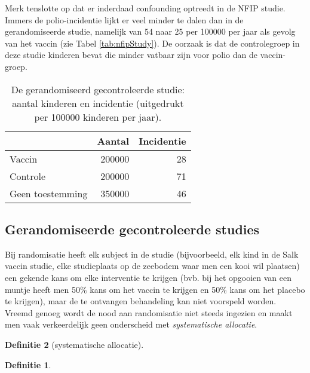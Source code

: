\documentclass[
  12pt,dutch,coursenotes]{book}
\theoremstyle{definition}
\newtheorem{definition}{Definitie}[chapter]
\theoremstyle{definition}
\theoremstyle{definition}
\theoremstyle{remark}
\begin{document}
Merk tenslotte op dat er inderdaad confounding optreedt in de NFIP studie. Immers
de polio-incidentie lijkt er veel minder te dalen dan in de gerandomiseerde studie, namelijk van 54 naar 25
per 100000 per jaar als gevolg van het vaccin (zie Tabel \ref{tab:nfipStudy}). De oorzaak is dat
de controlegroep in deze studie kinderen bevat die minder vatbaar zijn voor
polio dan de vaccin-groep.

\begin{table}[t]

\caption{\label{tab:dbrcStudy}De gerandomiseerd gecontroleerde studie: aantal kinderen en incidentie (uitgedrukt per
100000 kinderen per jaar).}
\centering
\begin{tabular}{lrr}
\toprule
  & Aantal & Incidentie\\
\midrule
Vaccin & 200000 & 28\\
Controle & 200000 & 71\\
Geen toestemming & 350000 & 46\\
\bottomrule
\end{tabular}
\end{table}

\hypertarget{gerandomiseerde-gecontroleerde-studies}{%
\subsection{Gerandomiseerde gecontroleerde studies}\label{gerandomiseerde-gecontroleerde-studies}}

Bij randomisatie heeft elk subject in de studie (bijvoorbeeld, elk kind in de Salk vaccin studie, elke studieplaats op de zeebodem waar men een kooi wil plaatsen) een gekende kans om elke interventie te krijgen (bvb. bij het opgooien van een muntje heeft men 50\% kans om het
vaccin te krijgen en 50\% kans om het placebo te krijgen), maar de te
ontvangen behandeling kan niet voorspeld worden. Vreemd genoeg wordt de nood
aan randomisatie niet steeds ingezien en maakt men vaak verkeerdelijk geen
onderscheid met \emph{systematische allocatie}.

\begin{definition}[systematische allocatie]
\begin{definition}

\protect\hypertarget{def:unnamed-chunk-70}{}{\label{def:unnamed-chunk-70} \iffalse (systematische allocatie) \fi{} }

\end{definition}
\end{definition}
\end{document}
